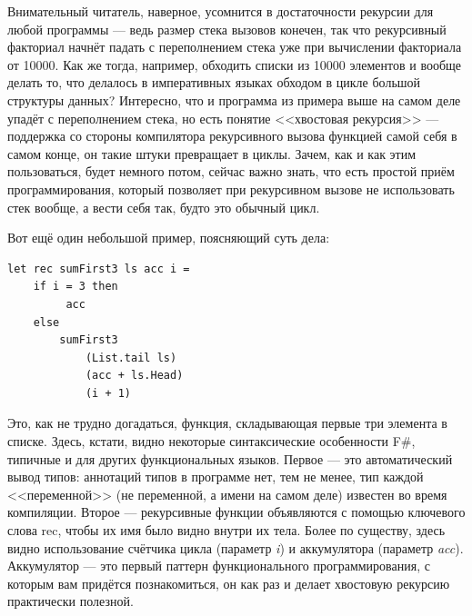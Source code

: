 \documentclass{../../text-style}
\begin{document}
Внимательный читатель, наверное, усомнится в достаточности рекурсии для любой программы --- ведь размер стека вызовов конечен, так что рекурсивный факториал начнёт падать с переполнением стека уже при вычислении факториала от 10000. Как же тогда, например, обходить списки из 10000 элементов и вообще делать то, что делалось в императивных языках обходом в цикле большой структуры данных? Интересно, что и программа из примера выше на самом деле упадёт с переполнением стека, но есть понятие <<хвостовая рекурсия>> --- поддержка со стороны компилятора рекурсивного вызова функцией самой себя в самом конце, он такие штуки превращает в циклы. Зачем, как и как этим пользоваться, будет немного потом, сейчас важно знать, что есть простой приём программирования, который позволяет при рекурсивном вызове не использовать стек вообще, а вести себя так, будто это обычный цикл.

Вот ещё один небольшой пример, поясняющий суть дела:
\begin{verbatim}
let rec sumFirst3 ls acc i =
    if i = 3 then 
         acc 
    else 
        sumFirst3 
            (List.tail ls) 
            (acc + ls.Head) 
            (i + 1)
\end{verbatim}

Это, как не трудно догадаться, функция, складывающая первые три элемента в списке. Здесь, кстати, видно некоторые синтаксические особенности F\#, типичные и для других функциональных языков. Первое --- это автоматический вывод типов: аннотаций типов в программе нет, тем не менее, тип каждой <<переменной>> (не переменной, а имени на самом деле) известен во время компиляции. Второе --- рекурсивные функции объявляются с помощью ключевого слова rec, чтобы их имя было видно внутри их тела. Более по существу, здесь видно использование счётчика цикла (параметр \textit{i}) и аккумулятора (параметр \textit{acc}). Аккумулятор --- это первый паттерн функционального программирования, с которым вам придётся познакомиться, он как раз и делает хвостовую рекурсию практически полезной. 
\end{document}
